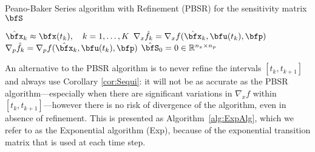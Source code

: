 \documentclass[DIV=12]{scrartcl} %
\theoremstyle{definition}
\begin{document}
\begin{algorithm}
 \caption{Peano-Baker Series algorithm with Refinement (PBSR) for the sensitivity matrix $\bfS$ \label{alg:PBSR}}

\SetAlgoLined
{}
$\hat{\bfx}_k\approx \bfx(t_k),\quad k=1,\dots,K$\;
$\nabla_x\hat{f}_k = \nabla_xf(\hat{\bfx}_k,\bfu(t_k),\bfp)$\;
$\nabla_p\hat{f}_k = \nabla_pf(\hat{\bfx}_k,\bfu(t_k),\bfp)$\;
$\hat{\bfS}_0=0\in\mathbb{R}^{n_x\times n_p}$\;

\end{algorithm}

An alternative to the PBSR algorithm 
is to never refine the intervals $[t_k,t_{k+1}]$ and always use Corollary \ref{cor:Sequi}: it will not be as accurate as the PBSR algorithm—especially when there are significant variations in $\nabla_xf$ within $[t_k,t_{k+1}]$—however there is no risk of divergence of the algorithm, even in absence of refinement. This is presented as Algorithm~\ref{alg:ExpAlg}, which we refer to as the Exponential algorithm (Exp), because of the exponential transition matrix that is used at each time step.
\end{document}
